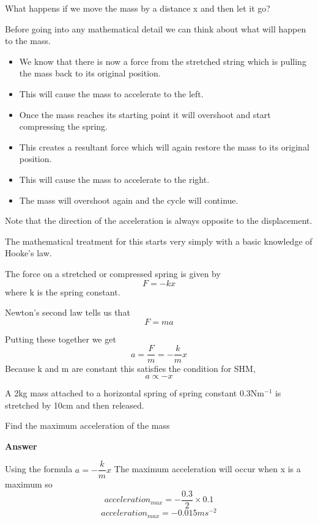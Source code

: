 \documentclass[revision-guide.tex]{subfiles}
\begin{document}
What happens if we move the mass by a distance x and then let it go?



Before going into any mathematical detail we can think about what will happen to the mass.
\begin{itemize}
\item We know that there is now a force from the stretched string which is pulling the mass back to its original position.
\item This will cause the mass to accelerate to the left.
\item Once the mass reaches its starting point it will overshoot and start compressing the spring.
\item This creates a resultant force which will again restore the mass to its original position.
\item This will cause the mass to accelerate to the right.
\item The mass will overshoot again and the cycle will continue.
\end{itemize}
Note that the direction of the acceleration is always opposite to the displacement.

The mathematical treatment for this starts very simply with a basic knowledge of Hooke's law.

The force on a stretched or compressed spring is given by
\[
F=-kx
\]
where k is the spring constant.

Newton's second law tells us that
\[
F=ma
\]

Putting these together we get
\[
a = \dfrac{F}{m}=-\dfrac{k}{m}x
\]
Because k and m are constant this satisfies the condition for SHM,
\[
a \propto -x
\]

\begin{example}
A  2kg mass attached to a horizontal spring of spring constant 0.3Nm$^{-1}$ is stretched by 10cm and then released.

Find the maximum acceleration of the mass


	\vspace{1cm}



		\textbf{Answer}

Using the formula $a = -\dfrac{k}{m}x$
The maximum acceleration will occur when x is a maximum so
\[
acceleration_{max} = - \dfrac{0.3}{2} \times 0.1
\]
\[
acceleration_{max} = -0.015 ms^{-2}
\]

\end{example}
\end{document}

